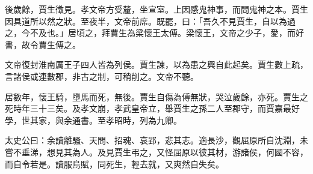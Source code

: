 \begin{pinyinscope}
後歲餘，賈生徵見。孝文帝方受釐，坐宣室。上因感鬼神事，而問鬼神之本。賈生因具道所以然之狀。至夜半，文帝前席。既罷，曰：「吾久不見賈生，自以為過之，今不及也。」居頃之，拜賈生為梁懷王太傅。梁懷王，文帝之少子，愛，而好書，故令賈生傅之。

文帝復封淮南厲王子四人皆為列侯。賈生諫，以為患之興自此起矣。賈生數上疏，言諸侯或連數郡，非古之制，可稍削之。文帝不聽。

居數年，懷王騎，墮馬而死，無後。賈生自傷為傅無狀，哭泣歲餘，亦死。賈生之死時年三十三矣。及孝文崩，孝武皇帝立，舉賈生之孫二人至郡守，而賈嘉最好學，世其家，與余通書。至孝昭時，列為九卿。

太史公曰：余讀離騷、天問、招魂、哀郢，悲其志。適長沙，觀屈原所自沈淵，未嘗不垂涕，想見其為人。及見賈生弔之，又怪屈原以彼其材，游諸侯，何國不容，而自令若是。讀服烏賦，同死生，輕去就，又爽然自失矣。


\end{pinyinscope}